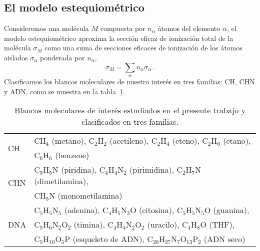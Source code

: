 \subsection{El modelo estequiométrico}
\label{subsec:stoichiometric}

Consideremos una molécula $M$ compuesta por $n_{\alpha}$ átomos del 
elemento $\alpha$, el modelo estequiométrico aproxima la sección eficaz 
de ionización total de la molécula $\sigma_{M}$ como una suma de 
secciones eficaces de ionización de los átomos aislados $\sigma_{\alpha}$ 
ponderada por $n_{\alpha}$, 
\begin{equation}
 \sigma_{M}=\sum\limits_{\alpha}n_{\alpha}\sigma_{\alpha}\,.  
 \label{eq:sumion}
\end{equation}
Clasificamos los blancos moleculares de nuestro interés en tres 
familias: CH, CHN y ADN, como se muestra en la tabla~\ref{tab:families}.

\begin{table}[t]
\begin{center}
\begin{tabular}{|p{}|p{}|}
\hline
\multirow{2}{*}{CH} & CH$_4$ (metano), C$_2$H$_2$ (acetileno), C$_2$H$_4$ (eteno), C$_2$H$_6$ (etano), \\ & C$_6$H$_6$ (benzene) \\
\hline
\multirow{2}{*}{CHN} & C$_5$H$_5$N (piridina), C$_4$H$_4$N$_2$ (pirimidina), C$_2$H$_7$N (dimetilamina), \\ & CH$_5$N (monometilamina) \\
\hline
\multirow{4}{*}{DNA} & C$_5$H$_5$N$_5$ (adenina), C$_4$H$_5$N$_3$O (citosina), C$_5$H$_5$N$_5$O (guanina), \\ & C$_5$H$_6$N$_2$O$_2$ (timina), C$_4$H$_4$N$_2$O$_2$ (uracilo), C$_4$H$_8$O (THF), \\
      & C$_5$H$_{10}$O$_5$P (esqueleto de ADN), C$_{20}$H$_{27}$N$_7$O$_{13}$P$_2$ 
(ADN seco) \\
\hline
\end{tabular}
\caption[Blancos moleculares estudiados y clasificados en tres familias.]
{Blancos moleculares de interés estudiados en el presente trabajo y 
clasificados en tres familias.}
\label{tab:families}
\end{center}
\end{table}

